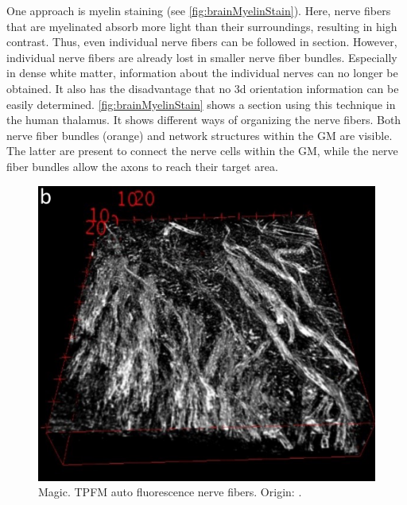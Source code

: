 One approach is myelin staining (see \cref{fig:brainMyelinStain}).
Here, nerve fibers that are myelinated absorb more light than their surroundings, resulting in high contrast.
Thus, even individual nerve fibers can be followed in section.
However, individual nerve fibers are already lost in smaller nerve fiber bundles.
Especially in dense white matter, information about the individual nerves can no longer be obtained.
It also has the disadvantage that no 3d orientation information can be easily determined.
\cref{fig:brainMyelinStain} shows a section using this technique in the human thalamus.
It shows different ways of organizing the nerve fibers.
Both nerve fiber bundles (orange) and network structures within the \ac{GM} are visible.
The latter are present to connect the nerve cells within the \ac{GM}, while the nerve fiber bundles allow the axons to reach their target area.
\par
%
%
\begin{figure}[!t]
	\centering
	\includegraphics{gfx/neuroanatomy/magic.png}
	\caption{Magic. TPFM auto fluorescence nerve fibers. Origin: \cite{Costantini2020}.}
	\label{fig:brainTPFM}
\end{figure}
%
